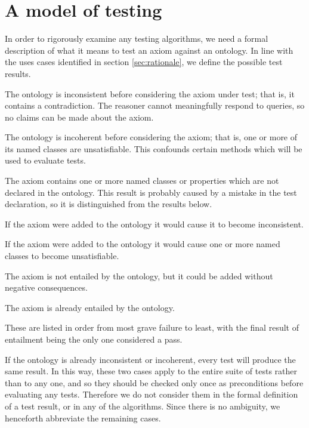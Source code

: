 \documentclass[paper.tex]{subfiles}
\begin{document}
\section{A model of testing}
\label{sec:model}

In order to rigorously examine any testing algorithms, we need a formal description of what it means to test an axiom against an ontology.
In line with the uses cases identified in section \ref{sec:rationale}, we define the possible test results.
\begin{description}[
  before={\renewcommand\makelabel[1]{\normalfont\itshape##1:}},
  labelindent=1em,
  leftmargin=2em,
  nosep,
]
  \item[Ontology already inconsistent]  The ontology is inconsistent before considering the axiom under test; that is, it contains a contradiction.  The reasoner cannot meaningfully respond to queries, so no claims can be made about the axiom.
  \item[Ontology already incoherent]  The ontology is incoherent before considering the axiom; that is, one or more of its named classes are unsatisfiable.  This confounds certain methods which will be used to evaluate tests.
  \item[Missing entity in axiom]  The axiom contains one or more named classes or properties which are not declared in the ontology.  This result is probably caused by a mistake in the test declaration, so it is distinguished from the results below.
  \item[Axiom causes inconsistency]  If the axiom were added to the ontology it would cause it to become inconsistent.
  \item[Axiom causes incoherence]  If the axiom were added to the ontology it would cause one or more named classes to become unsatisfiable.
  \item[Axiom absent]  The axiom is not entailed by the ontology, but it could be added without negative consequences.
  \item[Axiom entailed]  The axiom is already entailed by the ontology.
\end{description}

These are listed in order from most grave failure to least, with the final result of entailment being the only one considered a pass.

If the ontology is already inconsistent or incoherent, every test will produce the same result.  In this way, these two cases apply to the entire suite of tests rather than to any one, and so they should be checked only once as preconditions before evaluating any tests.  Therefore we do not consider them in the formal definition of a test result, or in any of the algorithms.  Since there is no ambiguity, we henceforth abbreviate the remaining cases.
\end{document}
